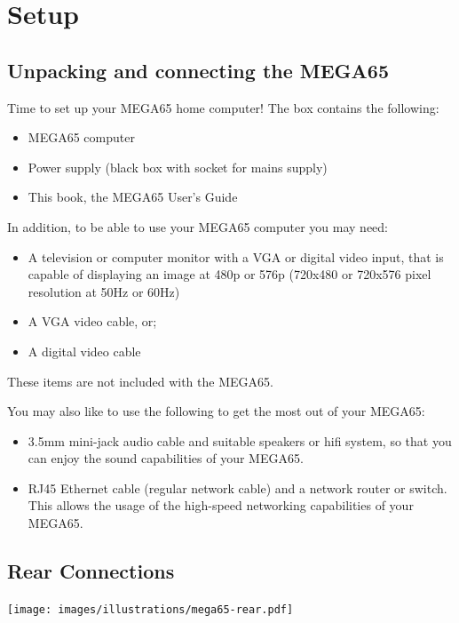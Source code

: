 \chapter{Setup}
\section{Unpacking and connecting the MEGA65}

Time to set up your MEGA65 home computer!
The box contains the following:
\begin{itemize}
\setlength\itemsep{-0.75mm}
\item MEGA65 computer
\item Power supply (black box with socket for mains supply)
\item This book, the MEGA65 User's Guide
\end{itemize}

In addition, to be able to use your MEGA65 computer you may need:
\begin{itemize}
	\item A television or computer monitor with a VGA or digital video input, that is capable of displaying an image at 480p or 576p (720x480 or 720x576 pixel resolution at 50Hz or 60Hz)
\item A VGA video cable, or;
\item A digital video cable
\end{itemize}

These items are not included with the MEGA65.

You may also like to use the following to get the most out of your MEGA65:
\begin{itemize}
\item 3.5mm mini-jack audio cable and suitable speakers or hifi system, so that you can enjoy the sound capabilities of your MEGA65.
\item RJ45 Ethernet cable (regular network cable) and a network router or switch. This allows the usage of the high-speed networking capabilities of your MEGA65.
\end{itemize}

\section{Rear Connections}

\texttt{[image: images/illustrations/mega65-rear.pdf]}

